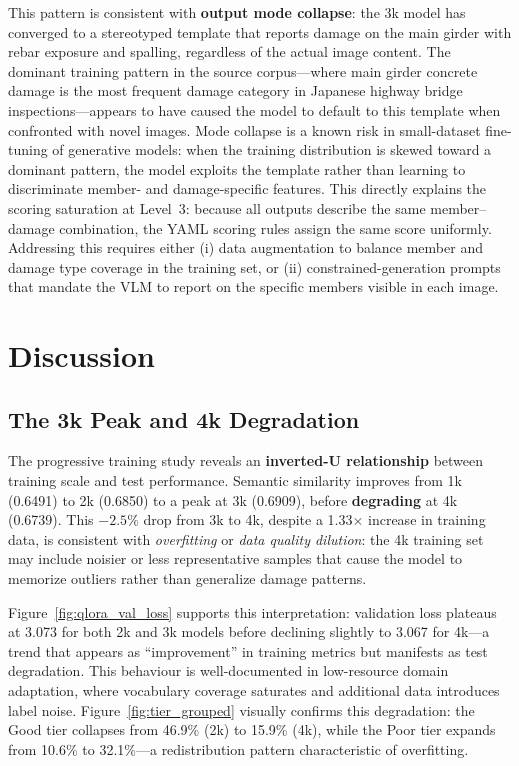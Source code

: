 \documentclass[twocolumn]{article}
\begin{document}
This pattern is consistent with \textbf{output mode collapse}: the 3k model
has converged to a stereotyped template that reports damage on the main girder
with rebar exposure and spalling, regardless of the actual image content.
The dominant training pattern in the source corpus---where main girder concrete
damage is the most frequent damage category in Japanese highway bridge
inspections---appears to have caused the model to default to this template
when confronted with novel images.
Mode collapse is a known risk in small-dataset fine-tuning of generative models:
when the training distribution is skewed toward a dominant pattern, the model
exploits the template rather than learning to discriminate member- and
damage-specific features.
This directly explains the scoring saturation at Level~3: because all outputs
describe the same member--damage combination, the YAML scoring rules assign
the same score uniformly.
Addressing this requires either (i) data augmentation to balance member and
damage type coverage in the training set, or (ii) constrained-generation prompts
that mandate the VLM to report on the specific members visible in each image.

\FloatBarrier

\section{Discussion}
\label{sec:discussion}

\subsection{The 3k Peak and 4k Degradation}

The progressive training study reveals an \textbf{inverted-U relationship}
between training scale and test performance.
Semantic similarity improves from 1k (0.6491) to 2k (0.6850) to a peak at
3k (0.6909), before \textbf{degrading} at 4k (0.6739).
This $-2.5\%$ drop from 3k to 4k, despite a 1.33$\times$ increase in training
data, is consistent with \textit{overfitting} or \textit{data quality dilution}:
the 4k training set may include noisier or less representative samples that
cause the model to memorize outliers rather than generalize damage patterns.

Figure~\ref{fig:qlora_val_loss} supports this interpretation: validation loss
plateaus at 3.073 for both 2k and 3k models before declining slightly to 3.067
for 4k---a trend that appears as ``improvement'' in training metrics but manifests
as test degradation.
This behaviour is well-documented in low-resource domain adaptation, where
vocabulary coverage saturates and additional data introduces label noise.
Figure~\ref{fig:tier_grouped} visually confirms this degradation: the Good tier
collapses from 46.9\% (2k) to 15.9\% (4k), while the Poor tier expands from
10.6\% to 32.1\%---a redistribution pattern characteristic of overfitting.
\end{document}

